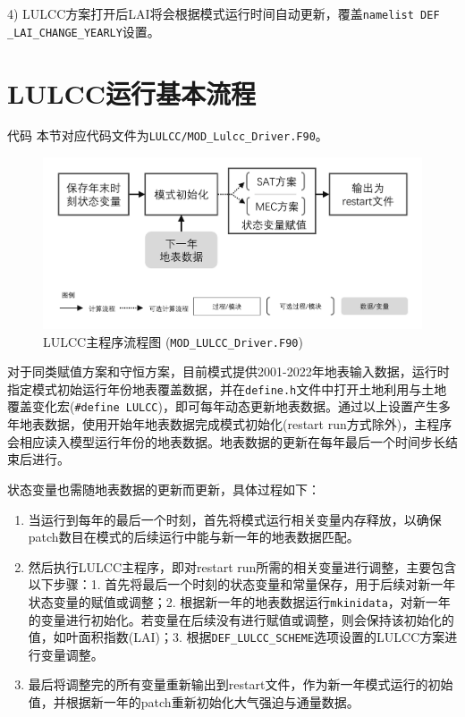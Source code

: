 4) LULCC方案打开后LAI将会根据模式运行时间自动更新，覆盖\texttt{namelist DEF\- \_LAI\_CHANGE\_YEARLY}设置。


\section{LULCC运行基本流程}
\begin{mymdframed}{代码}
  本节对应代码文件为\texttt{LULCC/MOD\_Lulcc\_Driver.F90}。
\end{mymdframed}

{
  \begin{figure}[htbp]
    \centering
    \includegraphics[width=0.85\columnwidth]{Figures/土地利用与土地覆盖变化模拟/LULCCDRIVER流程图.jpg}
    \caption{LULCC主程序流程图 (\texttt{MOD\_LULCC\_Driver.F90})}
    \label{fig:LULCC主程序流程图}
  \end{figure}
}

对于同类赋值方案和守恒方案，目前模式提供2001-2022年地表输入数据，运行时指定模式初始运行年份地表覆盖数据，并在\texttt{define.h}文件中打开土地利用与土地覆盖变化宏(\texttt{\#define LULCC})，即可每年动态更新地表数据。通过以上设置产生多年地表数据，使用开始年地表数据完成模式初始化(restart run方式除外)，主程序会相应读入模型运行年份的地表数据。地表数据的更新在每年最后一个时间步长结束后进行。

状态变量也需随地表数据的更新而更新，具体过程如下：

\begin{enumerate}
  \item 当运行到每年的最后一个时刻，首先将模式运行相关变量内存释放，以确保patch数目在模式的后续运行中能与新一年的地表数据匹配。

  \item 然后执行LULCC主程序，即对restart run所需的相关变量进行调整，主要包含以下步骤：1. 首先将最后一个时刻的状态变量和常量保存，用于后续对新一年状态变量的赋值或调整；2. 根据新一年的地表数据运行\texttt{mkinidata}，对新一年的变量进行初始化。若变量在后续没有进行赋值或调整，则会保持该初始化的值，如叶面积指数(LAI)；3. 根据\texttt{DEF\_LULCC\_SCHEME}选项设置的LULCC方案进行变量调整。

  \item 最后将调整完的所有变量重新输出到restart文件，作为新一年模式运行的初始值，并根据新一年的patch重新初始化大气强迫与通量数据。
\end{enumerate}

